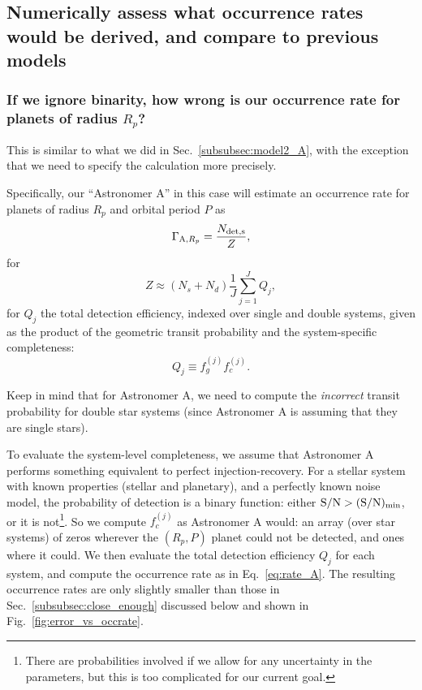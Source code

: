 \documentclass{emulateapj}
\begin{document}
\subsection{Numerically assess what occurrence rates would be derived, and 
	compare to previous models}

\subsubsection{If we ignore binarity, how wrong is our occurrence rate for 
	planets of radius $R_p$?}

This is similar to what we did in Sec.~\ref{subsubsec:model2_A}, with the 
exception that we need to specify the calculation more precisely.

Specifically, our ``Astronomer A'' in this case will estimate an occurrence 
rate for planets of radius $R_p$ and orbital period $P$ as
\begin{equation}
\Gamma_{{\rm A}, R_p} = \frac{N_{\rm det,s}}{Z},
\label{eq:rate_A}
\end{equation}
for
\begin{equation}
Z \approx (N_s + N_d) \frac{1}{J} \sum_{j=1}^{J} Q_j,
\end{equation}
for $Q_j$ the total detection efficiency, indexed over single and double 
systems, given as the product of the geometric transit probability and the 
system-specific completeness:
\begin{equation}
Q_j \equiv f_g^{(j)} f_c^{(j)}.
\end{equation}

Keep in mind that for Astronomer A, we need to compute the 
\textit{incorrect} transit probability for double star systems (since 
Astronomer A is assuming that they are single stars).

To evaluate the system-level completeness, we assume that Astronomer A performs 
something equivalent to perfect injection-recovery.
For a stellar system with known properties (stellar and planetary), and a 
perfectly known noise model, the probability of detection is a binary function: 
either ${\rm S/N} > {\rm (S/N)_{min}}$, or it is not\footnote{There are 
probabilities involved if we allow for any uncertainty in the parameters, but 
this is too complicated for our current goal.}.
So we compute $f_c^{(j)}$ as Astronomer A would: an array (over star systems) 
of zeros wherever the $(R_p,P)$ planet could not be detected, and ones where it 
could.
We then evaluate the total detection efficiency $Q_j$ for each system, and 
compute the occurrence rate as in Eq.~\ref{eq:rate_A}.
The resulting occurrence rates are only slightly smaller than those in 
Sec.~\ref{subsubsec:close_enough} discussed below and shown in 
Fig.~\ref{fig:error_vs_occrate}.
\end{document}
